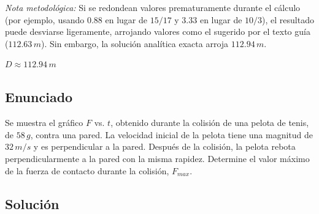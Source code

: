\documentclass[12pt, a4paper]{article}
\begin{document}
\textit{Nota metodológica:} Si se redondean valores prematuramente durante el cálculo (por ejemplo, usando $0.88$ en lugar de $15/17$ y $3.33$ en lugar de $10/3$), el resultado puede desviarse ligeramente, arrojando valores como el sugerido por el texto guía ($112.63 \, \si{m}$). Sin embargo, la solución analítica exacta arroja $112.94 \, \si{m}$.

\begin{tcolorbox}[colback=green!5!white, colframe=green!50!black, title=Respuesta Final]
\centering \Large $D \approx 112.94 \, \si{m}$
\end{tcolorbox}

\newpage

\subsection*{Enunciado}
Se muestra el gráfico $F$ vs. $t$, obtenido durante la colisión de una pelota de tenis, de $58 \, \si{g}$, contra una pared. La velocidad inicial de la pelota tiene una magnitud de $32 \, \si{m/s}$ y es perpendicular a la pared. Después de la colisión, la pelota rebota perpendicularmente a la pared con la misma rapidez. Determine el valor máximo de la fuerza de contacto durante la colisión, $F_{max}$.

\begin{center}
\end{center}

\subsection*{Solución}
\end{document}

